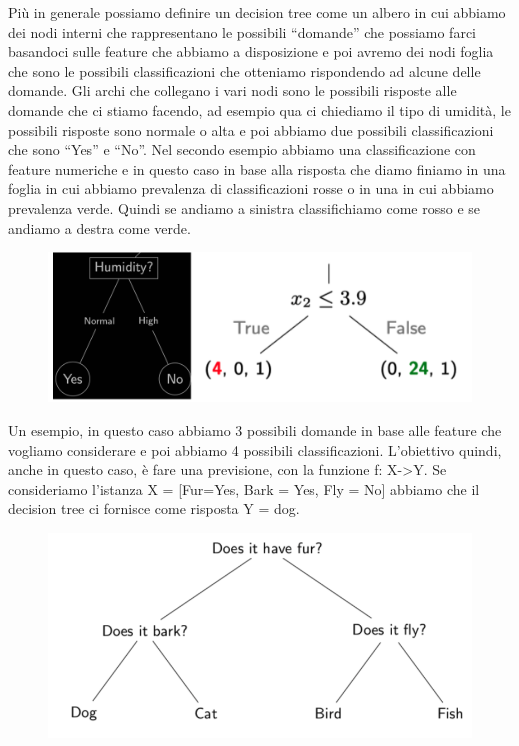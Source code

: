 \documentclass[14pt]{extreport}
\begin{document}
Più in generale possiamo definire un decision tree come un albero in cui abbiamo dei nodi interni che rappresentano le possibili “domande” che
possiamo farci basandoci sulle feature che abbiamo a disposizione e poi avremo dei nodi foglia che sono le possibili classificazioni che otteniamo
rispondendo ad alcune delle domande. Gli archi che collegano i vari nodi sono le possibili risposte alle domande che ci stiamo facendo, ad esempio qua
ci chiediamo il tipo di umidità, le possibili risposte sono normale o alta e poi abbiamo due possibili classificazioni che sono “Yes” e “No”. Nel
secondo esempio abbiamo una classificazione con feature numeriche e in questo caso in base alla risposta che diamo finiamo in una foglia in cui
abbiamo prevalenza di classificazioni rosse o in una in cui abbiamo prevalenza verde. Quindi se andiamo a sinistra classifichiamo come rosso e se
andiamo a destra come verde.


\begin{figure}[H]
	\centering
	\includegraphics[width=0.7\linewidth]{477.jpeg}
\end{figure}

Un esempio, in questo caso abbiamo 3 possibili domande in base alle feature che vogliamo considerare e poi abbiamo 4 possibili classificazioni.
L’obiettivo quindi, anche in questo caso, è fare una previsione, con la funzione f: X->Y. Se consideriamo l’istanza X = [Fur=Yes, Bark = Yes, Fly =
No] abbiamo che il decision tree ci fornisce come risposta Y = dog.



\begin{figure}[H]
	\centering
	\includegraphics[width=0.7\linewidth]{478.jpeg}
\end{figure}
\end{document}
